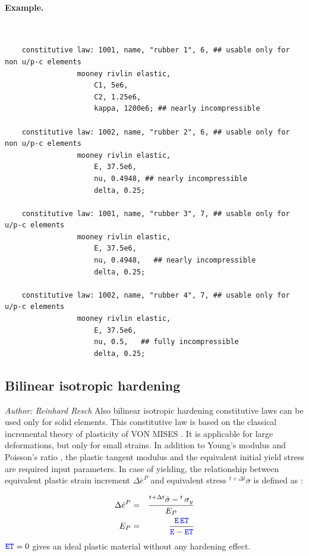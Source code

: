 \paragraph{Example.} \
\begin{verbatim}
    constitutive law: 1001, name, "rubber 1", 6, ## usable only for non u/p-c elements
                 mooney rivlin elastic,
                     C1, 5e6,
                     C2, 1.25e6,
                     kappa, 1200e6; ## nearly incompressible

    constitutive law: 1002, name, "rubber 2", 6, ## usable only for non u/p-c elements
                 mooney rivlin elastic,
                     E, 37.5e6,
                     nu, 0.4948, ## nearly incompressible
                     delta, 0.25;

    constitutive law: 1001, name, "rubber 3", 7, ## usable only for u/p-c elements
                 mooney rivlin elastic,
                     E, 37.5e6,
                     nu, 0.4948,   ## nearly incompressible
                     delta, 0.25;

    constitutive law: 1002, name, "rubber 4", 7, ## usable only for u/p-c elements
                 mooney rivlin elastic,
                     E, 37.5e6,
                     nu, 0.5,   ## fully incompressible
                     delta, 0.25;
\end{verbatim}

\subsection{Bilinear isotropic hardening}
\label{sec:CL:bilinear-isotropic-hardening}
\emph{Author: Reinhard Resch}
Also bilinear isotropic hardening constitutive laws can be used only for solid elements.
This constitutive law is based on the classical incremental theory of plasticity of VON MISES \cite{BATHE2016}.
It is applicable for large deformations, but only for small strains.
In addition to Young's modulus \nt{E} and Poisson's ratio \nt{nu}, the plastic tangent modulus 
and the equivalent initial yield stress \nt{sigmayv} are required input parameters.
In case of yielding, the relationship between equivalent plastic strain increment $\Delta \bar{e}^P$ and equivalent stress
${}^{t + \Delta t}\bar{\sigma}$ is defined as \cite{BATHE2016}:

\begin{eqnarray}
\Delta \bar{e}^P & = & \frac{{}^{t + \Delta t}\bar{\sigma} - {}^{t} \, \sigma_y}{E_P} \\
E_P & = & \frac{\textcolor{blue}{\texttt{E}} \, \textcolor{blue}{\texttt{ET}}}{\textcolor{blue}{\texttt{E}} - \textcolor{blue}{\texttt{ET}}}
\end{eqnarray}
$\textcolor{blue}{\texttt{ET}}=0$ gives an ideal plastic material without any hardening effect.

